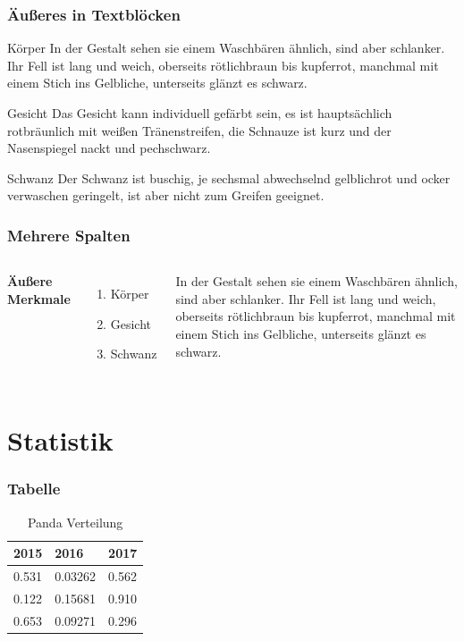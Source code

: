 \documentclass{beamer}
\begin{document}
\begin{frame}
\frametitle{Äußeres in Textblöcken}
\begin{block}{Körper}
In der Gestalt sehen sie einem Waschbären ähnlich, sind aber schlanker. Ihr Fell ist lang und weich, oberseits rötlichbraun bis kupferrot, manchmal mit einem Stich ins Gelbliche, unterseits glänzt es schwarz.
\end{block}
\pause
\begin{block}{Gesicht}
Das Gesicht kann individuell gefärbt sein, es ist hauptsächlich rotbräunlich mit weißen Tränenstreifen, die Schnauze ist kurz und der Nasenspiegel nackt und pechschwarz. 
\end{block}
\pause
\begin{block}{Schwanz}
Der Schwanz ist buschig, je sechsmal abwechselnd gelblichrot und ocker verwaschen geringelt, ist aber nicht zum Greifen geeignet.
\end{block}
\end{frame}

\begin{frame}
\frametitle{Mehrere Spalten}
\begin{columns}[c] %
 
\textbf{Äußere Merkmale}
\begin{enumerate}
\item Körper
\item Gesicht
\item Schwanz
\end{enumerate}

In der Gestalt sehen sie einem Waschbären ähnlich, sind aber schlanker. Ihr Fell ist lang und weich, oberseits rötlichbraun bis kupferrot, manchmal mit einem Stich ins Gelbliche, unterseits glänzt es schwarz.
 
\end{columns}
\end{frame}

\section{Statistik}

\begin{frame}
\frametitle{Tabelle}
\begin{table}
\begin{tabular}{l l l}
\toprule
\textbf{2015} & \textbf{2016} & \textbf{2017}\\
\midrule
0.531 & 0.03262 & 0.562 \\
0.122 & 0.15681 & 0.910 \\
0.653 & 0.09271 & 0.296 \\
\bottomrule
\end{tabular}
\caption{Panda Verteilung}
\end{table}
\end{frame}
\end{document}
